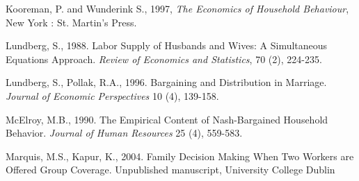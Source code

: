 \documentclass[legno,11pt]{article}
\begin{document}
\begin{thebibliography}{12}
 Kooreman, P. and Wunderink S., 1997, \emph{The Economics of Household Behaviour}, New York : St. Martin's Press.

 Lundberg, S., 1988.
                  Labor Supply of Husbands and Wives: A Simultaneous Equations Approach.
                  \textit{Review of Economics and Statistics}, 70 (2), 224-235.

 Lundberg, S., Pollak, R.A., 1996.
                 Bargaining and Distribution in Marriage.
                 \emph{Journal of Economic Perspectives} 10 (4), 139-158.





 McElroy, M.B., 1990.
                 The Empirical Content of Nash-Bargained Household Behavior.
                \emph{Journal of Human Resources} 25 (4), 559-583.


 Marquis, M.S., Kapur, K., 2004.  Family Decision Making When Two Workers are Offered Group Coverage.
                  Unpublished manuscript, University College Dublin



\end{thebibliography}
\end{document}
